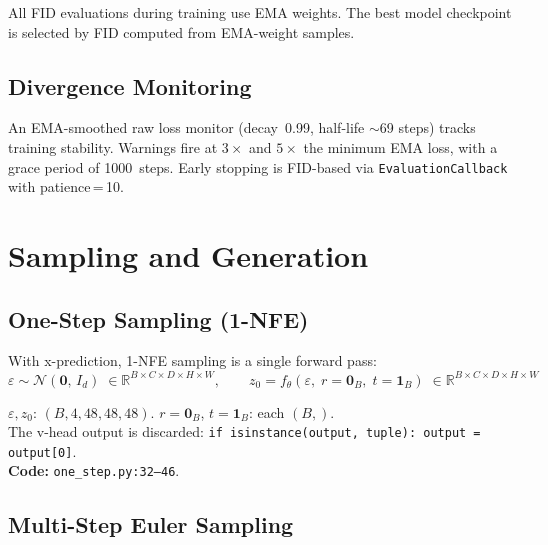 \documentclass[11pt,a4paper]{article}
\newcommand{\code}[1]{\texttt{#1}}
\begin{document}
\noindent
All FID evaluations during training use EMA weights.  The best model checkpoint
is selected by FID computed from EMA-weight samples.

\subsection{Divergence Monitoring}

An EMA-smoothed raw loss monitor (decay~0.99, half-life ${\sim}$69 steps)
tracks training stability.  Warnings fire at $3\times$ and $5\times$ the
minimum EMA loss, with a grace period of 1000~steps.  Early stopping is
FID-based via \code{EvaluationCallback} with patience\,=\,10.


\section{Sampling and Generation}
\label{sec:sampling}

\subsection{One-Step Sampling (1-NFE)}

With x-prediction, 1-NFE sampling is a single forward pass:
\begin{equation}
  \varepsilon \sim \mathcal{N}(\mathbf{0},\,I_d)
    \;\in \mathbb{R}^{B \times C \times D \times H \times W},
  \qquad
  z_0 = f_\theta(\varepsilon,\;r{=}\mathbf{0}_B,\;t{=}\mathbf{1}_B)
    \;\in \mathbb{R}^{B \times C \times D \times H \times W}
  \label{eq:1nfe_sampling}
\end{equation}
\begin{shapes}
$\varepsilon, z_0$: $(B, 4, 48, 48, 48)$.
\quad $r = \mathbf{0}_B$, $t = \mathbf{1}_B$: each $(B,)$.\\
The v-head output is discarded: \code{if isinstance(output, tuple): output = output[0]}.\\
\textbf{Code:} \code{one\_step.py:32--46}.
\end{shapes}

\subsection{Multi-Step Euler Sampling}
\end{document}
